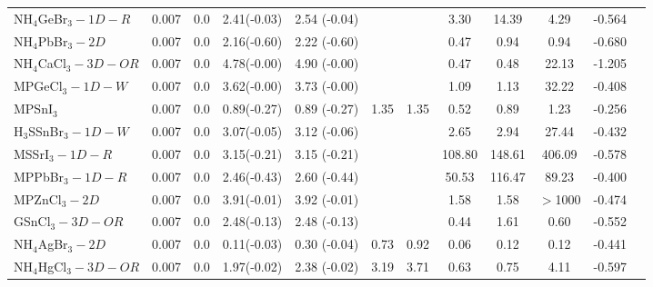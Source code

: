 \begin{table*}
\begin{tabular*}{0.98\textwidth}{@{\extracolsep{\fill}}l c c c c c c c c c c c}
 NH$_4$GeBr$_3-1D-R$&      0.007&        0.0&       2.41(-0.03)&            2.54  (-0.04)&           &                &            3.30&           14.39&            4.29&     -0.564\\
   NH$_4$PbBr$_3-2D$&      0.007&        0.0&       2.16(-0.60)&            2.22  (-0.60)&           &                &            0.47&            0.94&            0.94&     -0.680\\
NH$_4$CaCl$_3-3D-OR$&      0.007&        0.0&       4.78(-0.00)&            4.90  (-0.00)&           &                &            0.47&            0.48&           22.13&     -1.205\\
     MPGeCl$_3-1D-W$&      0.007&        0.0&       3.62(-0.00)&            3.73  (-0.00)&           &                &            1.09&            1.13&           32.22&     -0.408\\
           MPSnI$_3$&      0.007&        0.0&       0.89(-0.27)&            0.89  (-0.27)&       1.35&            1.35&            0.52&            0.89&            1.23&     -0.256\\
 H$_3$SSnBr$_3-1D-W$&      0.007&        0.0&       3.07(-0.05)&            3.12  (-0.06)&           &                &            2.65&            2.94&           27.44&     -0.432\\
      MSSrI$_3-1D-R$&      0.007&        0.0&       3.15(-0.21)&            3.15  (-0.21)&           &                &          108.80&          148.61&          406.09&     -0.578\\
     MPPbBr$_3-1D-R$&      0.007&        0.0&       2.46(-0.43)&            2.60  (-0.44)&           &                &           50.53&          116.47&           89.23&     -0.400\\
       MPZnCl$_3-2D$&      0.007&        0.0&       3.91(-0.01)&            3.92  (-0.01)&           &                &            1.58&            1.58&         $>$1000&     -0.474\\
     GSnCl$_3-3D-OR$&      0.007&        0.0&       2.48(-0.13)&            2.48  (-0.13)&           &                &            0.44&            1.61&            0.60&     -0.552\\
   NH$_4$AgBr$_3-2D$&      0.007&        0.0&       0.11(-0.03)&            0.30  (-0.04)&       0.73&            0.92&            0.06&            0.12&            0.12&     -0.441\\
NH$_4$HgCl$_3-3D-OR$&      0.007&        0.0&       1.97(-0.02)&            2.38  (-0.02)&       3.19&            3.71&            0.63&            0.75&            4.11&     -0.597\\

\end{tabular*}
\end{table*}
